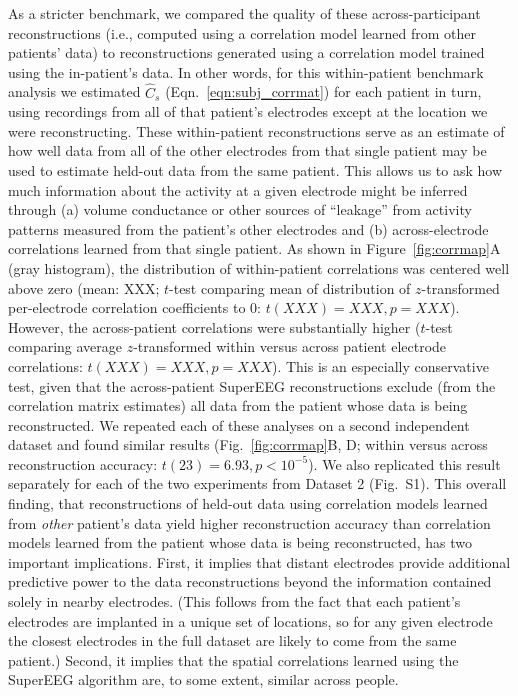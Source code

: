 \documentclass[11pt]{article}
\newcommand{\perexpcorrmaps}{S1}
\begin{document}
As a stricter benchmark, we compared the quality of these
across-participant reconstructions (i.e., computed using a correlation
model learned from other patients' data) to reconstructions generated
using a correlation model trained using the in-patient's data.  In
other words, for this within-patient benchmark analysis we estimated
$\hat{C}_{s}$ (Eqn.~\ref{eqn:subj_corrmat}) for each patient in turn,
using recordings from all of that patient's electrodes except at the
location we were reconstructing.  These within-patient reconstructions
serve as an estimate of how well data from all of the other electrodes
from that single patient may be used to estimate held-out data from
the same patient.  This allows us to ask how much information about
the activity at a given electrode might be inferred through (a) volume
conductance or other sources of ``leakage'' from activity patterns
measured from the patient's other electrodes and (b) across-electrode
correlations learned from that single patient.  As shown in
Figure~\ref{fig:corrmap}A (gray histogram), the distribution of
within-patient correlations was centered well above zero (mean: XXX;
$t$-test comparing mean of distribution of $z$-transformed
per-electrode correlation coefficients to 0: $t(XXX) = XXX, p = XXX$).
However, the across-patient correlations were substantially higher
($t$-test comparing average $z$-transformed within versus across
patient electrode correlations: $t(XXX) = XXX, p = XXX$).  This is an
especially conservative test, given that the across-patient SuperEEG
reconstructions exclude (from the correlation matrix estimates) all
data from the patient whose data is being reconstructed.  We repeated
each of these analyses on a second independent dataset and found
similar results (Fig.~\ref{fig:corrmap}B, D; within versus across
reconstruction accuracy: $t(23) = 6.93, p < 10^{-5}$). We also
replicated this result separately for each of the two experiments from
Dataset 2 (Fig.~\perexpcorrmaps).  This overall finding, that
reconstructions of held-out data using correlation models learned from
\textit{other} patient's data yield higher reconstruction accuracy
than correlation models learned from the patient whose data is being
reconstructed, has two important implications.  First, it implies that
distant electrodes provide additional predictive power to the data
reconstructions beyond the information contained solely in nearby
electrodes.  (This follows from the fact that each patient's
electrodes are implanted in a unique set of locations, so for any
given electrode the closest electrodes in the full dataset are likely
to come from the same patient.)  Second, it implies that the spatial
correlations learned using the SuperEEG algorithm are, to some extent,
similar across people.
\end{document}
